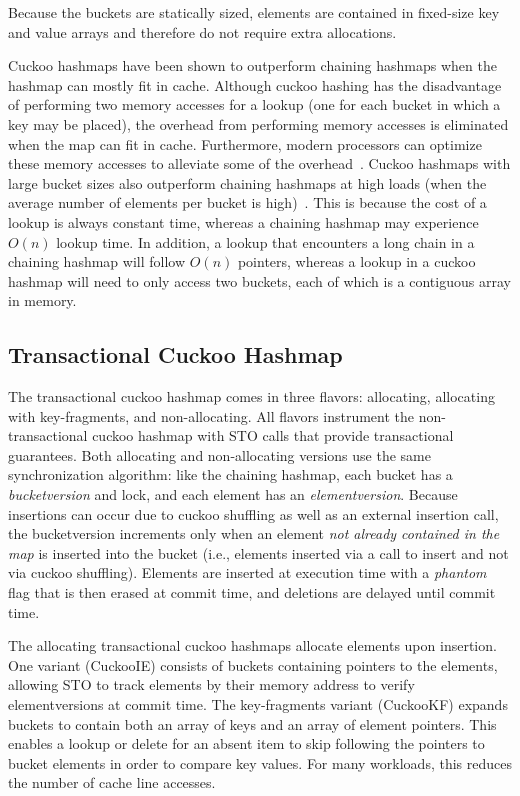 Because the buckets are statically sized, elements are contained in fixed-size key and value arrays and therefore do not require extra allocations.

Cuckoo hashmaps have been shown to outperform chaining hashmaps when the hashmap can mostly fit in cache. Although cuckoo hashing has the disadvantage of performing two memory accesses for a lookup (one for each bucket in which a key may be placed), the overhead from performing memory accesses is eliminated when the map can fit in cache.
Furthermore, modern processors can optimize these memory accesses to alleviate some of the overhead~\cite{chm_arch}.
Cuckoo hashmaps with large bucket sizes also outperform chaining hashmaps at high loads (when the average number of elements per bucket is high)~\cite{chm_load}. This is because the cost of a lookup is always constant time, whereas a chaining hashmap may experience $O(n)$ lookup time. In addition, a lookup that encounters a long chain in a chaining hashmap will follow $O(n)$ pointers, whereas a lookup in a cuckoo hashmap will need to only access two buckets, each of which is a contiguous array in memory.

\subsection{Transactional Cuckoo Hashmap}
The transactional cuckoo hashmap comes in three flavors: allocating, allocating with key-fragments, and non-allocating. All flavors instrument the non-transactional cuckoo hashmap with STO calls that provide transactional guarantees.
Both allocating and non-allocating versions use the same synchronization algorithm: like the chaining hashmap, each bucket has a \emph{bucketversion} and lock, and each element has an \emph{elementversion}. Because insertions can occur due to cuckoo shuffling as well as an external insertion call, the bucketversion increments only when an element \emph{not already contained in the map} is inserted into the bucket (i.e., elements inserted via a call to insert and not via cuckoo shuffling). Elements are inserted at execution time with a \emph{phantom} flag that is then erased at commit time, and deletions are delayed until commit time.

The allocating transactional cuckoo hashmaps allocate elements upon insertion. One variant (CuckooIE) consists of buckets containing pointers to the elements, allowing STO to track elements by their memory address to verify elementversions at commit time. The key-fragments variant (CuckooKF) expands buckets to contain both an array of keys and an array of element pointers. This enables a lookup or delete for an absent item to skip following the pointers to bucket elements in order to compare key values. For many workloads, this reduces the number of cache line accesses.

